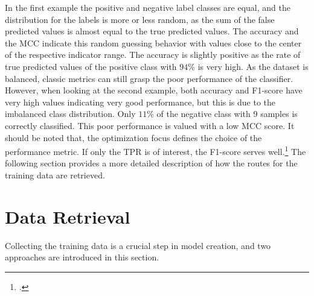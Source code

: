 In the first example the positive and negative label classes are equal, and the distribution for the
labels is more or less random, as the sum of the false predicted values is almost equal to
the true predicted values. The accuracy and the \gls{MCC} indicate this random guessing
behavior with values close to the center of the respective indicator range.
The accuracy is slightly positive as the rate of true predicted values of the positive class
with $94\%$ is very high. As the dataset is balanced, classic metrics can still grasp
the poor performance of the classifier. However, when looking at the second example, both
accuracy and F1-score have very high values indicating very good performance, but this is
due to the imbalanced class distribution. Only $11\%$ of the negative class with 9 samples
is correctly classified. This poor performance is valued with a low \gls{MCC} score.
It should be noted that, the optimization focus defines the choice of the performance metric.
If only the \gls{TPR} is of interest, the F1-score serves well.\footcite[cf.][p. 8f]{chicco_advantages_2020}
The following section provides a more detailed description of how the routes for the training data are retrieved.

\section{Data Retrieval}
\label{sec:DataRetrieval}

Collecting the training data is a crucial step in model creation, and two approaches are introduced in this section.

